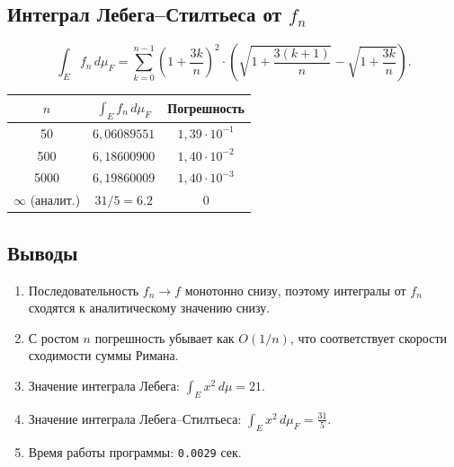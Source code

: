 \documentclass[12pt,a4paper]{article}
\theoremstyle{definition}
\begin{document}
\subsection{Интеграл Лебега–Стилтьеса от \texorpdfstring{$f_n$}{f\_n}}

\[
    \int_E f_n \, d\mu_F = \sum_{k=0}^{n-1} \left(1 + \frac{3k}{n}\right)^2
    \cdot \left(\sqrt{1 + \frac{3(k+1)}{n}} - \sqrt{1 + \frac{3k}{n}}\right).
\]

\begin{center}
\begin{tabular}{|c|c|c|}
    \hline
    $n$ & $\displaystyle\int_E f_n \, d\mu_F$ & Погрешность \\
    \hline
    50   & $6{,}06089551$ & $1{,}39 \cdot 10^{-1}$ \\
    500  & $6{,}18600900$ & $1{,}40 \cdot 10^{-2}$ \\
    5000 & $6{,}19860009$ & $1{,}40 \cdot 10^{-3}$ \\
    \hline
    $\infty$ (аналит.) & $31/5 = 6.2$ & $0$ \\
    \hline
\end{tabular}
\end{center}

\subsection{Выводы}

\begin{enumerate}
    \item Последовательность $f_n \to f$ монотонно снизу, поэтому интегралы от $f_n$
          сходятся к аналитическому значению снизу.
    \item С ростом $n$ погрешность убывает как $O(1/n)$, что соответствует
          скорости сходимости суммы Римана.
    \item Значение интеграла Лебега: $\displaystyle\int_E x^2 \, d\mu = 21$.
    \item Значение интеграла Лебега–Стилтьеса: $\displaystyle\int_E x^2 \, d\mu_F = \frac{31}{5}$.
    \item Время работы программы: \texttt{0.0029} сек.
\end{enumerate}
\end{document}
